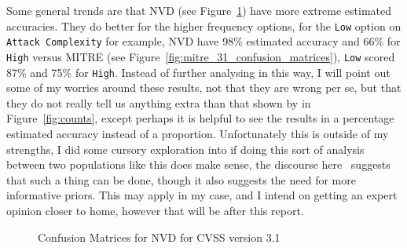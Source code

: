\documentclass[12pt]{article}
\begin{document}
Some general trends are that NVD (see Figure~\ref{fig:nvd_31_confusion_matrices}) have more extreme
estimated accuracies. They do better for the higher frequency options, for the \texttt{Low} option
on \texttt{Attack Complexity} for example, NVD have 98\% estimated accuracy and 66\% for
\texttt{High} versus MITRE (see Figure~\ref{fig:mitre_31_confusion_matrices}), \texttt{Low} scored
87\% and 75\% for \texttt{High}. Instead of further analysing in this way, I will point out some of
my worries around these results, not that they are wrong per se, but that they do not really tell us
anything extra than that shown by in Figure~\ref{fig:counts}, except perhaps it is helpful to see
the results in a percentage estimated accuracy instead of a proportion. Unfortunately this is
outside of my strengths, I did some cursory exploration into if doing this sort of analysis
between two populations like this does make sense, the discourse here~\cite{stat_modeling} suggests
that such a thing can be done, though it also suggests the need for more informative priors. This
may apply in my case, and I intend on getting an expert opinion closer to home, however that will be
after this report.

\bigskip

\begin{figure}[H]
	\centering
	\caption{\label{fig:nvd_31_confusion_matrices}Confusion Matrices for NVD for CVSS version 3.1}
\end{figure}
\end{document}
